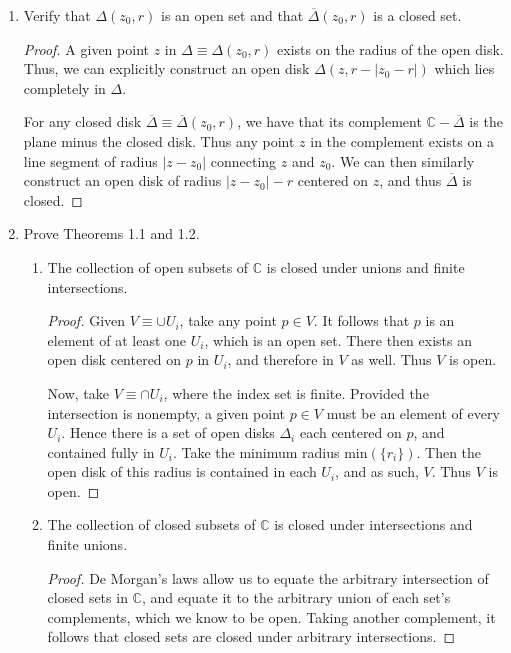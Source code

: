 \documentclass[12pt,a4paper]{article}
\newcommand{\C}{\mathbb{C}}
\begin{document}
\begin{enumerate}[label={\bfseries II.5.\arabic*}]
	\item  Verify that $\Delta(z_0, r)$ is an open set and that $\overline{\Delta}(z_0,r)$ is a
	closed set.
	
	\begin{proof}
		A given point $z$ in $\Delta \equiv \Delta(z_0, r)$ exists on the radius of the open disk. Thus,
		we can explicitly construct an open disk $\Delta(z, r-|z_0-r|)$ which lies completely in $\Delta$.

		For any closed disk $\overline{\Delta} \equiv \overline{\Delta}(z_0, r)$, we have that its complement
		$\C - \overline{\Delta}$ is the plane minus the closed disk. Thus any point $z$ in the complement
		exists on a line segment of radius $|z-z_0|$ connecting $z$ and $z_0$. We can then similarly
		construct an open disk of radius $|z-z_0|-r$ centered on $z$,	and thus $\overline\Delta$ is closed.
	\end{proof}

	\item Prove Theorems 1.1 and 1.2.
		\begin{enumerate}[label={\bfseries Theorem 1.\arabic*}]
			\item The collection of open subsets of $\C$ is closed under unions and finite intersections.
			\begin{proof}
				Given $V \equiv \cup U_i$, take any point $p \in V$. It follows that $p$ is an element of at
				least one $U_i$, which is an open set. There then exists an open disk centered on $p$ in $U_i$,
				and therefore in $V$ as well. Thus $V$ is open.

				Now, take $V \equiv \cap U_i$, where the index set is finite. Provided the intersection is
				nonempty, a given point $p \in V$ must be an element of every $U_i$. Hence there is a set of
				open disks $\Delta_i$ each centered on $p$, and contained fully in $U_i$. Take the minimum
				radius min$(\{r_i\})$. Then the open disk of this radius is contained in each $U_i$, and as
				such, $V$. Thus $V$ is open.
			\end{proof}

			\item The collection of closed subsets of $\C$ is closed under intersections and finite unions.
			\begin{proof}
				De Morgan's laws allow us to equate the arbitrary intersection of closed sets in $\C$, and
				equate it to the arbitrary union of each set's complements, which we know to be open. Taking
				another complement, it follows that closed sets are closed under arbitrary intersections.


\end{proof}
\end{enumerate}
\end{enumerate}
\end{document}
